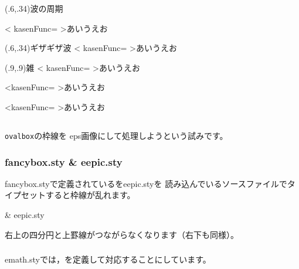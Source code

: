 \documentclass[a4j]{jarticle}
\begin{document}
\begin{showEx}(.6,.34){波の周期}

\psnamikasen<%
  kasenFunc={}%
>{あいうえお}
\end{showEx}

\begin{showEx}(.6,.34){ギザギザ波}
\psnamikasen<%
kasenFunc={}
>{あいうえお}
\end{showEx}

\begin{showEx}(.9,.9){雑}
\namikasenUehosei{2pt}%
\psnamikasen<%
  kasenFunc={}
>{あいうえお}

\psnamikasen<kasenFunc={%
  \xmin\xmax}
>{あいうえお}

\psnamikasen<kasenFunc={%
  \xmin\xmax}
>{あいうえお}
\end{showEx}

\subsection{\texorpdfstring{}{ovalbox}}
\texttt{ovalbox}の枠線を eps画像にして処理しようという試みです。

\subsubsection{\textsf{fancybox.sty} \& \textsf{eepic.sty}}
\textsf{fancybox.sty}で定義されているを\textsf{eepic.sty}を
読み込んでいるソースファイルでタイプセットすると枠線が乱れます。

\begin{showEx}{ \& \textsf{eepic.sty}}
\end{showEx}

右上の四分円と上罫線がつながらなくなります（右下も同様）。

\subsubsection{\texorpdfstring{}{emovalbox}}
\textsf{emath.sty}では，を定義して対応することにしています。

\begin{showEx}{}
\end{showEx}
\end{document}
